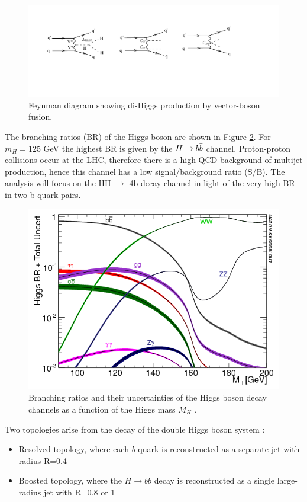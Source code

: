 \begin{figure}[hbt]
    \centering
    \includegraphics[width=1\linewidth]{Images/5.SPANet/VBF.pdf}
    \caption{Feynman diagram showing di-Higgs production by vector-boson fusion.}
    \label{fig: VF f}
\end{figure}

The branching ratios (BR) of the Higgs boson are shown in Figure \ref{fig: BR Higgs}. For $m_H=125$ GeV the highest BR is given by the $H\to b\Bar{b}$ channel. Proton-proton collisions occur at the LHC, therefore there is a high QCD background of multijet production, hence this channel has a low signal/background ratio (S/B). The analysis will focus on the HH $\to$ 4b decay channel in light of the very high BR in two b-quark pairs.

\begin{figure}[hbt]
    \centering
    \includegraphics[width=0.7\linewidth]{Images/4.HH4b Analysis/Higgs intro/BR_higgs.png}
    \caption{Branching ratios and their uncertainties of the Higgs boson decay channels as a function of the Higgs mass $M_H$ \cite{BR_plot}.}
    \label{fig: BR Higgs}
\end{figure}

\noindent Two topologies arise from the decay of the double Higgs boson system \cite{talklucacometa}:
\begin{itemize}
    \item Resolved topology, where each $b$ quark is reconstructed as a separate jet with radius R=0.4
    \item Boosted topology, where the $H\to bb$ decay is reconstructed as a single large-radius jet with R=0.8 or 1
\end{itemize}

